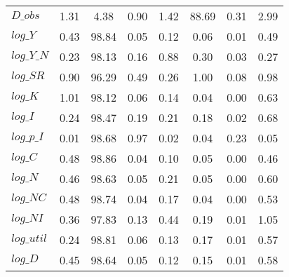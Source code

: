 \begin{center}
\begin{longtable}{lccccccc}
$D\_obs     $	 & 	        1.31	 & 	        4.38	 & 	        0.90	 & 	        1.42	 & 	       88.69	 & 	        0.31	 & 	        2.99 \\ 
$log\_Y     $	 & 	        0.43	 & 	       98.84	 & 	        0.05	 & 	        0.12	 & 	        0.06	 & 	        0.01	 & 	        0.49 \\ 
$log\_Y\_N  $	 & 	        0.23	 & 	       98.13	 & 	        0.16	 & 	        0.88	 & 	        0.30	 & 	        0.03	 & 	        0.27 \\ 
$log\_SR    $	 & 	        0.90	 & 	       96.29	 & 	        0.49	 & 	        0.26	 & 	        1.00	 & 	        0.08	 & 	        0.98 \\ 
$log\_K     $	 & 	        1.01	 & 	       98.12	 & 	        0.06	 & 	        0.14	 & 	        0.04	 & 	        0.00	 & 	        0.63 \\ 
$log\_I     $	 & 	        0.24	 & 	       98.47	 & 	        0.19	 & 	        0.21	 & 	        0.18	 & 	        0.02	 & 	        0.68 \\ 
$log\_p\_I  $	 & 	        0.01	 & 	       98.68	 & 	        0.97	 & 	        0.02	 & 	        0.04	 & 	        0.23	 & 	        0.05 \\ 
$log\_C     $	 & 	        0.48	 & 	       98.86	 & 	        0.04	 & 	        0.10	 & 	        0.05	 & 	        0.00	 & 	        0.46 \\ 
$log\_N     $	 & 	        0.46	 & 	       98.63	 & 	        0.05	 & 	        0.21	 & 	        0.05	 & 	        0.00	 & 	        0.60 \\ 
$log\_NC    $	 & 	        0.48	 & 	       98.74	 & 	        0.04	 & 	        0.17	 & 	        0.04	 & 	        0.00	 & 	        0.53 \\ 
$log\_NI    $	 & 	        0.36	 & 	       97.83	 & 	        0.13	 & 	        0.44	 & 	        0.19	 & 	        0.01	 & 	        1.05 \\ 
$log\_util  $	 & 	        0.24	 & 	       98.81	 & 	        0.06	 & 	        0.13	 & 	        0.17	 & 	        0.01	 & 	        0.57 \\ 
$log\_D     $	 & 	        0.45	 & 	       98.64	 & 	        0.05	 & 	        0.12	 & 	        0.15	 & 	        0.01	 & 	        0.58 \\ 
\end{longtable}
 \end{center}
